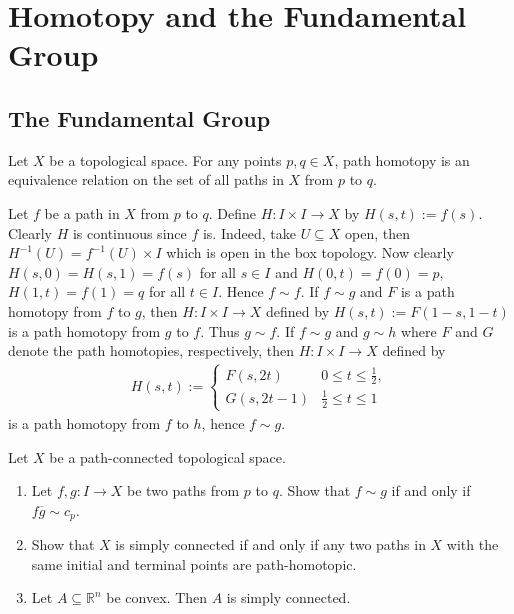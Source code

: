 \chapter{Homotopy and the Fundamental Group}
\section{The Fundamental Group}
\begin{exercise}
Let $X$ be a topological space. For any points $p,q \in X$, path homotopy is an equivalence relation on the set of all paths in $X$ from $p$ to $q$.
\end{exercise}

\begin{solution}
Let $f$ be a path in $X$ from $p$ to $q$. Define $H: I \times I \to X$ by $H(s,t) := f(s)$. Clearly $H$ is continuous since $f$ is. Indeed, take $U \subseteq X$ open, then $H^{-1}(U) = f^{-1}(U) \times I$ which is open in the box topology. Now clearly $H(s,0) = H(s,1) = f(s)$ for all $s \in I$ and $H(0,t) = f(0) = p$, $H(1,t) = f(1) = q$ for all $t \in I$. Hence $f \sim f$. If $f \sim g$ and $F$ is a path homotopy from $f$ to $g$, then $H: I \times I \to X$ defined by $H(s,t) := F(1-s,1-t)$ is a path homotopy from $g$ to $f$. Thus $g \sim f$. If $f \sim g$ and $g \sim h$ where $F$ and $G$ denote the path homotopies, respectively, then $H: I \times I \to X$ defined by
\begin{align*}
H(s,t) := \begin{cases}
F(s,2t) & 0 \leq t \leq \frac{1}{2},\\
G(s,2t - 1) & \frac{1}{2} \leq t \leq 1
\end{cases}
\end{align*}
\noindent is a path homotopy from $f$ to $h$, hence $f \sim g$.
\end{solution}

\begin{exercise}
Let $X$ be a path-connected topological space.
\begin{enumerate}[label = \textup{(}\alph*\textup{)}]
\item Let $f,g:I \to X$ be two paths from $p$ to $q$. Show that $f \sim g$ if and only if $f\overline{g} \sim c_p$.
\item Show that $X$ is simply connected if and only if any two paths in $X$ with the same initial and terminal points are path-homotopic.
\item Let $A \subseteq \mathbb{R}^n$ be convex. Then $A$ is simply connected.
\end{enumerate}
\end{exercise}

